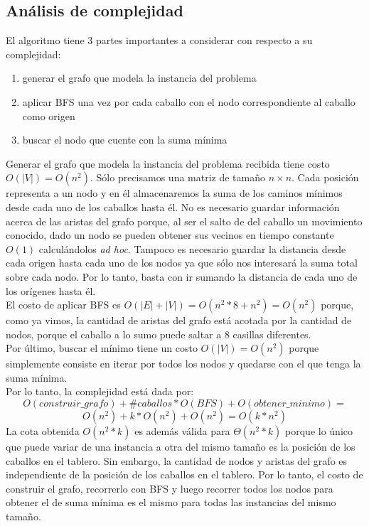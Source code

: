 \subsection{Análisis de complejidad}
El algoritmo tiene 3 partes importantes a considerar con respecto a su complejidad:
\begin{enumerate}
  \item generar el grafo que modela la instancia del problema
  \item aplicar BFS una vez por cada caballo con el nodo correspondiente al caballo como origen
  \item buscar el nodo que cuente con la suma mínima
\end{enumerate}
Generar el grafo que modela la instancia del problema recibida tiene costo $O(\left\vert{V}\right\vert) = O(n^2)$. 
Sólo precisamos una matriz de tamaño $n \times n$. Cada posición representa a un nodo y en él almacenaremos la suma
de los caminos mínimos desde cada uno de los caballos hasta él. No es necesario guardar información acerca de las
aristas del grafo porque, al ser el salto de del caballo un movimiento conocido, dado un nodo se pueden obtener sus vecinos
en tiempo constante $O(1)$ calculándolos \textit{ad hoc}.
Tampoco es necesario guardar la distancia desde cada origen hasta cada uno de los nodos ya que sólo nos interesará
la suma total sobre cada nodo. Por lo tanto, basta con ir sumando la distancia de cada uno de los orígenes hasta él.\\
El costo de aplicar BFS es $O(\left\vert{E}\right\vert + \left\vert{V}\right\vert) = O(n^2 * 8 + n^2) = O(n^2)$ \cite[1]{cormen} porque, 
como ya vimos, la cantidad de aristas del grafo está acotada por la cantidad de nodos, porque el caballo a lo sumo
puede saltar a 8 casillas diferentes.\\
Por último, buscar el mínimo tiene un costo $O(\left\vert{V}\right\vert) = O(n^2)$ porque simplemente consiste
en iterar por todos los nodos y quedarse con el que tenga la suma mínima.\\
Por lo tanto, la complejidad está dada por:
\begin{displaymath}
  O(construir\_grafo) + \#caballos * O(BFS) + O(obtener\_minimo) = 
\end{displaymath}
\begin{displaymath}
  O(n^2) + k * O(n^2) + O(n^2) = O(k * n^2)
\end{displaymath}
La cota obtenida $O(n^2 * k)$ es además válida para $\Theta (n^2 * k)$ porque lo único que puede variar de una
instancia a otra del mismo tamaño es la posición de los caballos en el tablero. Sin embargo, la cantidad de nodos
y aristas del grafo es independiente de la posición de los caballos en el tablero. Por lo tanto, el costo de
construir el grafo, recorrerlo con BFS y luego recorrer todos los nodos para obtener el de suma mínima
es el mismo para todas las instancias del mismo tamaño.

